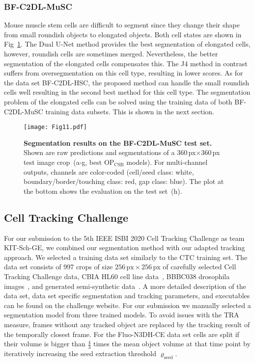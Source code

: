 \documentclass[10pt,letterpaper]{article}
\begin{document}
\subsubsection*{BF-C2DL-MuSC}
Mouse muscle stem cells are difficult to segment since they change their shape from small roundish objects to elongated objects. Both cell states are shown in Fig~\ref{fig:bf-c2dl-musc-results}. The Dual U-Net method provides the best segmentation of elongated cells, however, roundish cells are sometimes merged. Nevertheless, the better segmentation of the elongated cells compensates this. The J4 method in contrast suffers from oversegmentation on this cell type, resulting in lower scores. As for the data set BF-C2DL-HSC, the proposed method can handle the small roundish cells well resulting in the second best method for this cell type. The segmentation problem of the elongated cells can be solved using the training data of both BF-C2DL-MuSC training data subsets. This is shown in the next section.
\begin{figure}
\begin{adjustwidth}{-2.25in}{0in}
\centering
\texttt{[image: Fig11.pdf]}
\caption{\textbf{Segmentation results on the BF-C2DL-MuSC test set.} Shown are raw predictions and segmentations of a 360\,px$\times$360\,px test image crop~(a-g, best $\mathrm{OP}_{\text{CSB}}$ models). For multi-channel outputs, channels are color-coded (cell/seed class: white, boundary/border/touching class: red, gap class: blue). The plot at the bottom shows the evaluation on the test set~(h).}
\label{fig:bf-c2dl-musc-results}
\end{adjustwidth}
\end{figure}

\subsection*{Cell Tracking Challenge}
For our submission to the 5th IEEE ISBI 2020 Cell Tracking Challenge as team KIT-Sch-GE, we combined our segmentation method with our adapted tracking approach. We selected a training data set similarly to the CTC training set. The data set consists of 997 crops of size $256\,\text{px}\!\times\!256\,\text{px}$ of carefully selected Cell Tracking Challenge data, CBIA HL60 cell line data~\cite{Svoboda2009}, BBBC038 drosophila images~\cite{Caicedo2019}, and generated semi-synthetic data~\cite{Stegmaier2017, Stegmaier2016}. A more detailed description of the data set, data set specific segmentation and tracking parameters, and executables can be found on the challenge website. For our submission we manually selected a segmentation model from three trained models. To avoid issues with the TRA measure, frames without any tracked object are replaced by the tracking result of the temporally closest frame. For the Fluo-N3DH-CE data set cells are split if their volume is bigger than $\frac{4}{3}$ times the mean object volume at that time point by iteratively increasing the seed extraction threshold $\varrho_{\text{seed}}$.
\end{document}
